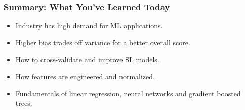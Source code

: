 \begin{frame}
\frametitle{Summary: What You've Learned Today}
\begin{itemize}
	\item Industry has high demand for ML applications.\pause
	\item Higher bias trades off variance for a better overall score.\pause
	\item How to cross-validate and improve SL models.\pause
	\item How features are engineered and normalized.\pause
	\item Fundamentals of linear regression, neural networks and gradient boosted trees.
\end{itemize}
\end{frame}

